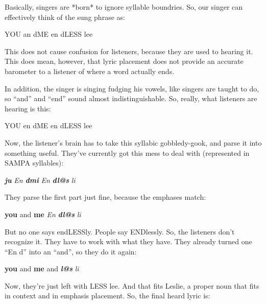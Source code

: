 Basically, singers are *born* to ignore syllable boundries. So, our singer can effectively think of the sung phrase as:

\begin{center}
YOU an dME en dLESS lee
\end{center}

This does not cause confusion for listeners, because they are used to hearing it. This does mean, however, that lyric placement does not provide an accurate barometer to a listener of where a word actually ends.

In addition, the singer is singing fudging his vowels, like singers are taught to do, so ``and'' and ``end'' sound almost indistinguishable. So, really, what listeners are hearing is this:

\begin{center}
YOU en dME en dLESS lee
\end{center}

 Now, the listener's brain has to take this syllabic gobbledy-gook, and parse it into something useful. They've currently got this mess to deal with (represented in SAMPA syllables):

\begin{center}
{\large \textit{\textbf{ju }}}{\large \textit{En }}{\large \textit{\textbf{dmi 
}}}{\large \textit{En }}{\large \textit{\textbf{dl@s }}}{\large \textit{li}}
\end{center}

 They parse the first part just fine, because the emphases match:

\begin{center}
{\large \textbf{you }}{\large and }{\large \textbf{me }}{\large \textit{En }}{\large \textit{\textbf{dl@s 
}}}{\large \textit{li}}
\end{center}

But no one says endLESSly. People say ENDlessly. So, the listeners don't recognize it. They have to work with what they have. They already turned one ``En d'' into an ``and'', so they do it again:

\begin{center}
{\large \textbf{you }}{\large and }{\large \textbf{me }}{\large and }{\large \textit{\textbf{l@s 
}}}{\large \textit{li}}
\end{center}

Now, they're just left with LESS lee. And that fits Leslie, a proper noun that fits in context and in emphasis placement. So, the final heard lyric is:

